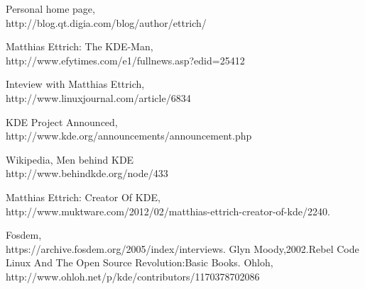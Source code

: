 \documentclass[DIV=calc, paper=a4, fontsize=11pt]{scrartcl}
\begin{document}
\begin{thebibliography}{99} 
              Personal home page,\\
              http://blog.qt.digia.com/blog/author/ettrich/ 
    
              Matthias Ettrich: The KDE-Man,\\
              http://www.efytimes.com/e1/fullnews.asp?edid=25412 
              
               Inteview with Matthias Ettrich,\\
               http://www.linuxjournal.com/article/6834 
               
             KDE Project Announced,\\
             http://www.kde.org/announcements/announcement.php
             
           Wikipedia,
     Men behind KDE\\
                http://www.behindkde.org/node/433
                
           Matthias Ettrich: Creator Of KDE,\\
           http://www.muktware.com/2012/02/matthias-ettrich-creator-of-kde/2240.
        
          Fosdem,\\
          https://archive.fosdem.org/2005/index/interviews.
    Glyn Moody,2002.Rebel Code Linux And The Open Source Revolution:Basic Books.
    Ohloh,\\
    http://www.ohloh.net/p/kde/contributors/1170378702086
\end{thebibliography}
\end{document}
